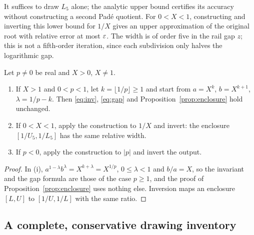 It suffices to draw $L_5$ alone; the analytic upper bound certifies its accuracy without constructing
a second Pad\'e quotient. For $0<X<1$, constructing and inverting this lower bound for $1/X$ gives an
upper approximation of the original root with relative error at most $\varepsilon$. The width is of order
five in the rail gap $z$; this is not a fifth-order iteration, since each subdivision only halves the
logarithmic gap.

\begin{proposition}\label{prop:allp}
Let $p\neq0$ be real and $X>0$, $X\neq1$.
\begin{enumerate}[label=(\roman*)]
\item If $X>1$ and $0<p<1$, let $k=\lfloor1/p\rfloor\ge1$ and start from $a=X^{k}$, $b=X^{k+1}$,
  $\lambda=1/p-k$. Then \eqref{eq:inv}, \eqref{eq:gap} and Proposition~\ref{prop:enclosure} hold
  unchanged.
\item If $0<X<1$, apply the construction to $1/X$ and invert: the enclosure $[1/U_5,1/L_5]$ has the same
  relative width.
\item If $p<0$, apply the construction to $|p|$ and invert the output.
\end{enumerate}
\end{proposition}
\begin{proof}
In (i), $a^{1-\lambda}b^{\lambda}=X^{k+\lambda}=X^{1/p}$, $0\le\lambda<1$ and $b/a=X$, so the invariant
and the gap formula are those of the case $p\ge1$, and the proof of Proposition~\ref{prop:enclosure}
uses nothing else. Inversion maps an enclosure $[L,U]$ to $[1/U,1/L]$ with the same ratio.
\end{proof}

\subsection{A complete, conservative drawing inventory}\label{sec:macros}

